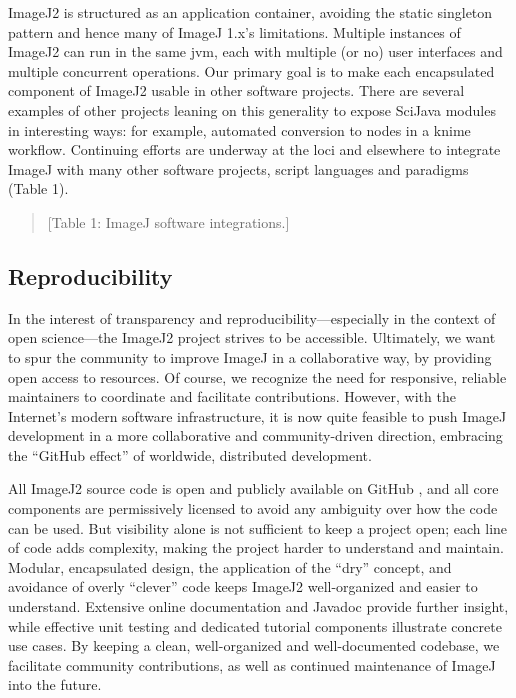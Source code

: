 \documentclass{bmcart}
\begin{document}
ImageJ2 is structured as an application container, avoiding the static
singleton pattern and hence many of ImageJ 1.x's limitations. Multiple
instances of ImageJ2 can run in the same \acrshort{jvm}, each with multiple (or
no) user interfaces and multiple concurrent operations. Our primary goal is to
make each encapsulated component of ImageJ2 usable in other software projects.
There are several examples of other projects leaning on this generality to
expose SciJava modules in interesting ways: for example, automated conversion
to nodes in a \acrshort{knime} workflow. Continuing efforts are underway at
the \acrfull{loci} and elsewhere to integrate ImageJ with many other software
projects, script languages and paradigms (Table 1).

\begin{quote}
[Table 1: ImageJ software integrations.]
\end{quote}

\subsection*{Reproducibility}

In the interest of transparency and reproducibility---especially in the context
of open science---the ImageJ2 project strives to be accessible. Ultimately, we
want to spur the community to improve ImageJ in a collaborative way, by
providing open access to resources. Of course, we recognize the need for
responsive, reliable maintainers to coordinate and facilitate contributions.
However, with the Internet's modern software infrastructure, it is now quite
feasible to push ImageJ development in a more collaborative and
community-driven direction, embracing the ``GitHub effect''
\cite{github_effect} of worldwide, distributed development.

All ImageJ2 source code is open and publicly available on GitHub
\cite{imagej_source_code}, and all core components are permissively licensed
\cite{imagej_licensing} to avoid any ambiguity over how the code can be used.
But visibility alone is not sufficient to keep a project open; each line of
code adds complexity, making the project harder to understand and maintain.
Modular, encapsulated design, the application of the ``\acrfull{dry}'' concept,
and avoidance of overly ``clever'' code keeps ImageJ2 well-organized and easier
to understand. Extensive online documentation \cite{imagej_web_site} and
Javadoc \cite{imagej_javadoc} provide further insight, while effective unit
testing and dedicated tutorial components \cite{imagej_tutorials}
illustrate concrete use cases. By
keeping a clean, well-organized and well-documented codebase, we facilitate
community contributions, as well as continued maintenance of ImageJ into the
future.
\end{document}
